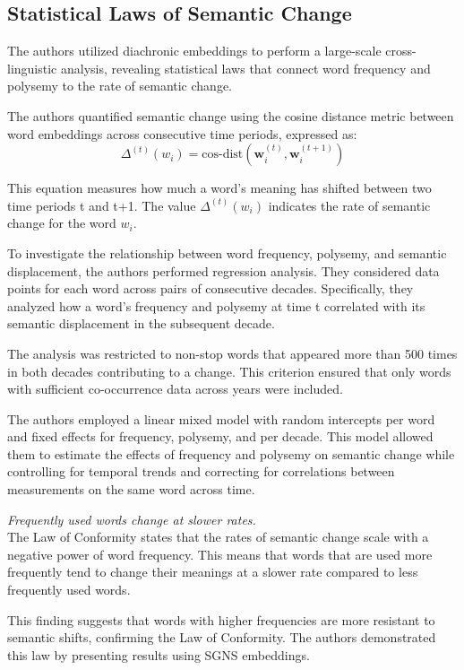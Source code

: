 \subsection{Statistical Laws of Semantic Change}\label{subsec:statistical-laws-of-semantic-change}
The authors utilized diachronic embeddings to perform a large-scale cross-linguistic analysis,
revealing statistical laws that connect word frequency and polysemy to the rate of semantic change.

The authors quantified semantic change using the cosine distance metric between word embeddings across consecutive time periods, expressed as:
\begin{equation}
\Delta^{(t)}(w_i) = \text{cos-dist}(\mathbf{w}_i^{(t)}, \mathbf{w}_i^{(t+1)})
\label{eq:equation4}
\end{equation}

This equation measures how much a word’s meaning has shifted between two time periods t and t+1.
The value $\Delta^{(t)}(w_i)$ indicates the rate of semantic change for the word $w_i$.

To investigate the relationship between word frequency, polysemy, and semantic displacement, the authors performed regression analysis.
They considered data points for each word across pairs of consecutive decades.
Specifically, they analyzed how a word’s frequency and polysemy at time t correlated with its semantic displacement in the subsequent decade.

The analysis was restricted to non-stop words that appeared more than 500 times in both decades contributing to a change.
This criterion ensured that only words with sufficient co-occurrence data across years were included.

The authors employed a linear mixed model with random intercepts per word and fixed effects for frequency, polysemy, and per decade.
This model allowed them to estimate the effects of frequency and polysemy on semantic change while controlling for temporal trends and correcting for correlations between measurements on the same word across time.

 \emph{Frequently used words change at slower rates.}\\
The Law of Conformity states that the rates of semantic change scale with a negative power of word frequency.
This means that words that are used more frequently tend to change their meanings at a slower rate compared to less frequently used words.

This finding suggests that words with higher frequencies are more resistant to semantic shifts, confirming the Law of Conformity.
The authors demonstrated this law by presenting results using SGNS embeddings.

